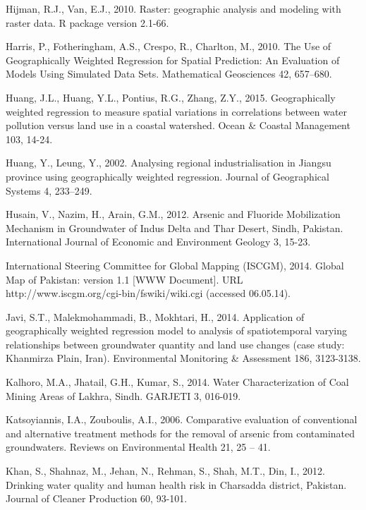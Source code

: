 \begin{thebibliography}
\bibitem{} \hangindent=1cm Hijman, R.J., Van, E.J., 2010. Raster: geographic analysis and modeling with raster data. R package version 2.1-66.

\bibitem{} \hangindent=1cm Harris, P., Fotheringham, A.S., Crespo, R., Charlton, M., 2010. The Use of Geographically Weighted Regression for Spatial Prediction: An Evaluation of Models Using Simulated Data Sets. Mathematical Geosciences 42, 657–680.

\bibitem{} \hangindent=1cm Huang, J.L., Huang, Y.L., Pontius, R.G., Zhang, Z.Y., 2015. Geographically weighted regression to measure spatial variations in correlations between water pollution versus land use in a coastal watershed. Ocean \& Coastal Management 103, 14-24.

\bibitem{} \hangindent=1cm Huang, Y., Leung, Y., 2002. Analysing regional industrialisation in Jiangsu province using geographically weighted regression. Journal of Geographical Systems 4, 233–249. 

\bibitem{} \hangindent=1cm Husain, V., Nazim, H., Arain, G.M., 2012. Arsenic and Fluoride Mobilization Mechanism in Groundwater of Indus Delta and Thar Desert, Sindh, Pakistan. International Journal of Economic and Environment Geology 3, 15-23.

\bibitem{} \hangindent=1cm International Steering Committee for Global Mapping (ISCGM), 2014. Global Map of Pakistan: version 1.1 [WWW Document]. URL http://www.iscgm.org/cgi-bin/fswiki/wiki.cgi (accessed 06.05.14).

\bibitem{} \hangindent=1cm Javi, S.T., Malekmohammadi, B., Mokhtari, H., 2014. Application of geographically weighted regression model to analysis of spatiotemporal varying relationships between groundwater quantity and land use changes (case study: Khanmirza Plain, Iran). Environmental Monitoring \& Assessment 186, 3123-3138.

\bibitem{} \hangindent=1cm Kalhoro, M.A., Jhatail, G.H., Kumar, S., 2014. Water Characterization of Coal Mining Areas of Lakhra, Sindh. GARJETI 3, 016-019.

\bibitem{} \hangindent=1cm Katsoyiannis, I.A., Zouboulis, A.I., 2006. Comparative evaluation of conventional and alternative treatment methods for the removal of arsenic from contaminated groundwaters. Reviews on Environmental Health 21, 25 – 41.

\bibitem{} \hangindent=1cm Khan, S., Shahnaz, M., Jehan, N., Rehman, S., Shah, M.T., Din, I., 2012. Drinking water quality and human health risk in Charsadda district, Pakistan. Journal of Cleaner Production 60, 93-101.


\end{thebibliography}
